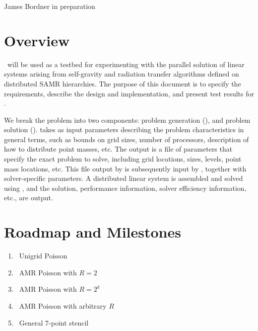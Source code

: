 \documentclass[10pt]{article}
\begin{document}
      {James Bordner}
      {in preparation}

\tableofcontents
\section{Overview}

   \hypresolve\ will be used as a testbed for experimenting with the
   parallel solution of linear systems arising from self-gravity and
   radiation transfer algorithms defined on distributed SAMR
   hierarchies.  The purpose of this document is to specify the
   requirements, describe the design and implementation, and present
   test results for \hypresolve.

   We break the problem into two components: problem generation
   (), and problem solution ().
    takes as input parameters describing the problem
   characteristics in general terms, such as bounds on grid sizes,
   number of processors, description of how to distribute point
   masses, etc.  The output is a file of parameters that specify the
   exact problem to solve, including grid locations, sizes, levels,
   point mass locations, etc.  This file output by 
   is subsequently input by , together with
   solver-specific parameters.  A distributed linear system is
   assembled and solved using \hypre, and the solution, performance
   information, solver efficiency information, etc., are output.


\section{Roadmap and Milestones}

\begin{enumerate}
\item \todo\ Unigrid Poisson
\item \todo\ AMR Poisson with $R=2$
\item \todo\ AMR Poisson with $R=2^k$
\item \todo\ AMR Poisson with arbitrary $R$
\item \todo\ General $7$-point stencil
\end{enumerate}
\end{document}
